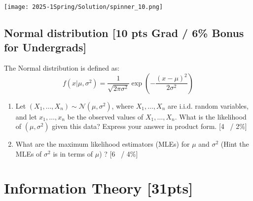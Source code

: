 \documentclass{article}
\begin{document}
\begin{center}
    \texttt{[image: 2025-1Spring/Solution/spinner\_10.png]} 
\end{center}

\newpage

\subsection{Normal distribution [10 pts Grad / 6\% Bonus for Undergrads]}
The Normal distribution is defined as:
 $$f(x| \mu, \sigma^2) = \frac{1}{\sqrt{2\pi \sigma^2}} \exp\left(-\frac{(x - \mu)^2}{2\sigma^2}\right)$$
 
\begin{enumerate}[label=(\alph*)]

   \item  Let \((X_1, \ldots, X_n) \sim \mathcal{N}(\mu, \sigma^2)\), where \(X_1, \ldots, X_n\) are i.i.d. random variables, and let \(x_1, \ldots, x_n\) be the observed values of \(X_1, \ldots, X_n\). What is the likelihood of \((\mu, \sigma^2)\) given this data? Express your answer in product form. [4~ / 2\%]
   \item What are the maximum likelihood estimators (MLEs) for \(\mu\) and \(\sigma^2\) (Hint the MLEs of  \(\sigma^2\) is in terms of \(\mu\)) ? [6~ / 4\%] 
\end{enumerate}

\newpage

\section{Information Theory [31pts]}
\end{document}
